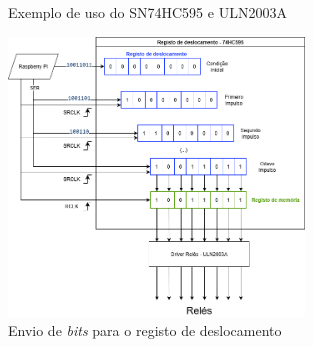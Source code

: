 \begin{figure}[hbtp]
	\centering%
		\centering
		\qquad
		\caption{Exemplo de uso do SN74HC595 e ULN2003A}%
		\label{fig:ligacao5952003}%
	\end{figure}

\begin{figure}[hbtp]
	\centering
	\includegraphics[width=0.7\textwidth]{figures/registo deslocamente.drawio.png}
	\caption{Envio de \textit{bits} para o registo de deslocamento}
	\label{fig:esquematico74hc595}
\end{figure}


